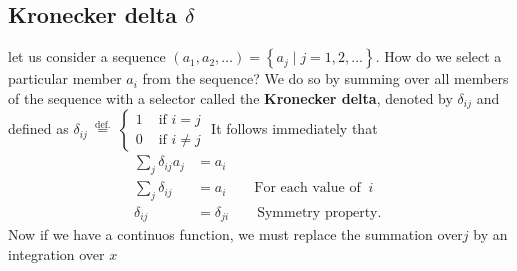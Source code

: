 \subsection{Kronecker delta $\delta$}
let us consider a sequence $\left(a_{1}, a_{2}, \ldots\right)=\left\{a_{j} \mid j=1,2, \ldots\right\} .$ How do we select a particular member $a_{i}$ from the sequence? We do so by summing over all members of the sequence with a selector called the \textbf{Kronecker delta}, denoted by $\delta_{i j}$ and defined as
$\delta_{i j} \stackrel{\text { def. }}{=}\left\{\begin{array}{ll}1 & \text { if } i=j \\ 0 & \text { if } i \neq j\end{array}\right.$
It follows immediately that
\begin{align*}
\sum_{j} \delta_{i j} a_{j}&=a_{i}\\
\sum_{j} \delta_{i j}&=a_{i}\qquad \text{For each value of } \ i\\
\delta_{i j}&=\delta_{j i} \qquad \text{Symmetry property. }
\end{align*}
Now if  we have a continuos function, we must replace the summation over$j$ by an integration over $x$

